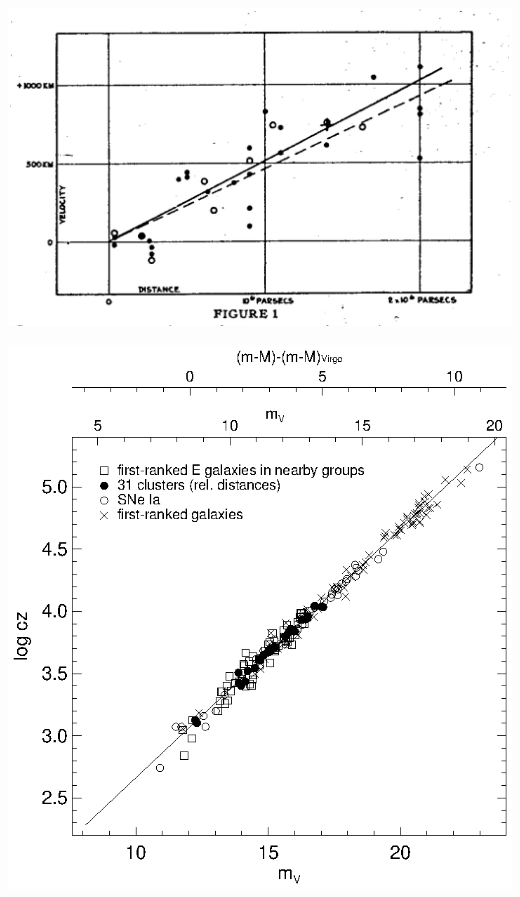 \documentclass[12pt]{article}
\begin{document}
\pagebreak

\begin{minipage}{\linewidth}
  \vspace{-3 cm}
  \hspace{-1 cm} \includegraphics[width=\linewidth]{hubble.eps}
  \vspace{-3 cm}
\end{minipage}
\begin{minipage}{\linewidth}
  \vspace{3 cm}
  \hspace{-1 cm} \includegraphics[width=\linewidth]{tammann1998.eps}
  \vspace{-3 cm}
\end{minipage}
\end{document}
